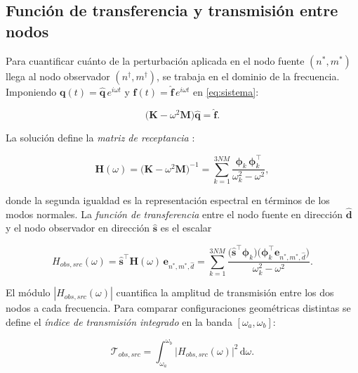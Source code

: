\documentclass[11pt,letterpaper]{article}
\begin{document}
\subsection{Función de transferencia y transmisión entre nodos}

Para cuantificar cuánto de la perturbación aplicada en el nodo fuente
$(n^*,m^*)$ llega al nodo observador $(n^\dagger,m^\dagger)$, se trabaja
en el dominio de la frecuencia. Imponiendo $\mathbf{q}(t)=
\hat{\mathbf{q}}\,e^{i\omega t}$ y $\mathbf{f}(t)=\hat{\mathbf{f}}\,
e^{i\omega t}$ en \eqref{eq:sistema}:

\begin{equation}\label{eq:freq_domain}
    \bigl(\mathbf{K} - \omega^2\mathbf{M}\bigr)\hat{\mathbf{q}}
    = \hat{\mathbf{f}}.
\end{equation}

La solución define la \emph{matriz de receptancia} \cite{ewins2000,inman2014}:

\begin{equation}\label{eq:receptancia}
    \mathbf{H}(\omega)
    = \bigl(\mathbf{K} - \omega^2\mathbf{M}\bigr)^{-1}
    = \sum_{k=1}^{3NM}
      \frac{\boldsymbol{\phi}_k\,\boldsymbol{\phi}_k^\top}
           {\omega_k^2 - \omega^2},
\end{equation}

donde la segunda igualdad es la representación espectral en términos de
los modos normales. La \emph{función de transferencia} entre el nodo
fuente en dirección $\hat{\mathbf{d}}$ y el nodo observador en dirección
$\hat{\mathbf{s}}$ es el escalar

\begin{equation}\label{eq:transferencia}
    H_{obs,src}(\omega)
    = \hat{\mathbf{s}}^\top\mathbf{H}(\omega)\,
      \mathbf{e}_{n^*,m^*,\hat{d}}
    = \sum_{k=1}^{3NM}
      \frac{
          \bigl(\hat{\mathbf{s}}^\top\boldsymbol{\phi}_k\bigr)
          \bigl(\boldsymbol{\phi}_k^\top\mathbf{e}_{n^*,m^*,\hat{d}}\bigr)
      }{\omega_k^2 - \omega^2}.
\end{equation}

El módulo $|H_{obs,src}(\omega)|$ cuantifica la amplitud de transmisión
entre los dos nodos a cada frecuencia. Para comparar configuraciones
geométricas distintas se define el \emph{índice de transmisión integrado}
en la banda $[\omega_a,\omega_b]$:

\begin{equation}\label{eq:indice}
    \mathcal{T}_{obs,src}
    = \int_{\omega_a}^{\omega_b}
      \lvert H_{obs,src}(\omega)\rvert^2\,\mathrm{d}\omega.
\end{equation}
\end{document}
